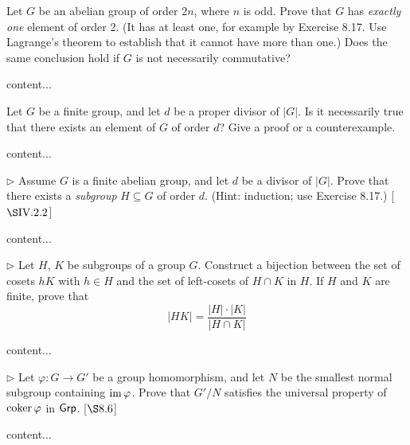 \begin{exercise}
	Let $G$ be an abelian group of order $2n$, where $n$ is odd. Prove that $G$ has \emph{exactly one} element of order 2. (It has at least one, for example by Exercise 8.17. Use Lagrange's theorem to establish that it cannot have more than one.) Does the same conclusion hold if $G$ is not necessarily commutative?
\end{exercise}
\begin{solution}
	content...
\end{solution}

\begin{exercise}
	Let $G$ be a finite group, and let $d$ be a proper divisor of $|G|$. Is it necessarily true that there exists an element of $G$ of order $d$? Give a proof or a counterexample.
\end{exercise}
\begin{solution}
	content...
\end{solution}

\begin{exercise}
	$\triangleright$ Assume $G$ is a finite abelian group, and let $d$ be a divisor of $|G|$. Prove that there exists a \emph{subgroup} $H\subseteq G$ of order $d$. (Hint: induction; use Exercise 8.17.) [$\S \RNo{4}.2.2$]
\end{exercise}
\begin{solution}
	content...
\end{solution}

\begin{exercise}
	$\triangleright$ Let $H$, $K$ be subgroups of a group $G$. Construct a bijection between the set of cosets $hK$ with $h\in H$ and the set of left-cosets of $H\cap K$ in $H$. If $H$ and $K$ are finite, prove that 
	\[
		|HK| = \frac{|H|\cdot|K|}{|H\cap K|}
	\]
\end{exercise}
\begin{solution}
	content...
\end{solution}

\begin{exercise}
	$\triangleright$ Let $\varphi\colon G \to G'$ be a group homomorphism, and let $N$ be the smallest normal subgroup containing $\operatorname{im} \varphi$. Prove that $G'/N$ satisfies the universal property of $\operatorname{coker} \varphi$ in $\textsf{Grp}$. [$\S 8.6$]
\end{exercise}
\begin{solution}
	content...
\end{solution}

